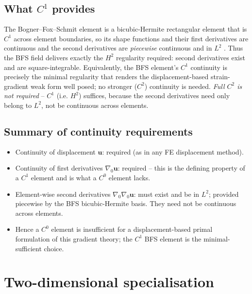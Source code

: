\documentclass[11pt]{article}
\newcommand{\bu}{\mathbf{u}}
\newcommand{\bu}{\mathbf{u}}
\begin{document}
\subsection{What $C^{1}$ provides}

The Bogner--Fox--Schmit element is a bicubic-Hermite rectangular
element that is $C^{1}$ across element boundaries, so its shape
functions and their first derivatives are continuous and the second
derivatives are \emph{piecewise} continuous and in $L^{2}$
\cite{Bathe2006,BonetWood2008}. Thus the BFS field delivers exactly the
$H^{2}$ regularity required: second derivatives exist and are
square-integrable. Equivalently, the BFS element's $C^{1}$ continuity is precisely the minimal regularity that renders the displacement-based strain-gradient weak form well posed; no stronger ($C^{2}$) continuity is needed. \emph{Full $C^{2}$ is not required} -- $C^{1}$ (i.e.
$H^{2}$) suffices, because the second derivatives need only belong to
$L^{2}$, not be continuous across elements.

\subsection{Summary of continuity requirements}

\begin{itemize}
\item Continuity of displacement $\bu$: required (as in any FE
displacement method).

\item Continuity of first derivatives $\nabla_{0}\bu$: required -- this
is the defining property of a $C^{1}$ element and is what a $C^{0}$
element lacks.

\item Element-wise second derivatives $\nabla_{0}\nabla_{0}\bu$: must
exist and be in $L^{2}$; provided piecewise by the BFS bicubic-Hermite
basis. They need not be continuous across elements.

\item Hence a $C^{0}$ element is insufficient for a
displacement-based primal formulation of this gradient theory; the
$C^{1}$ BFS element is the minimal-sufficient choice.
\end{itemize}

\section{Two-dimensional specialisation}
\label{sec:2d}
\end{document}
